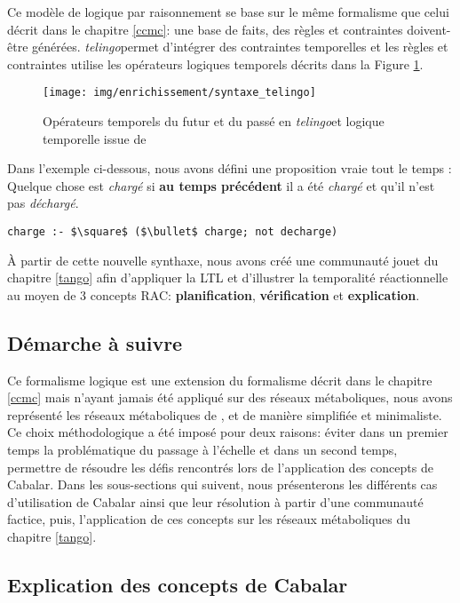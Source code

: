 \documentclass[../main.tex]{subfiles}
\begin{document}
Ce modèle de logique par raisonnement se base sur le même formalisme que celui décrit dans le chapitre \ref{ccmc}: une base de faits, des règles et contraintes doivent-être générées. \textit{telingo}permet d'intégrer des contraintes temporelles et les règles et contraintes utilise les opérateurs logiques temporels décrits dans la Figure \ref{fig:syntaxe}.

 \begin{figure}[h!]
	\centering
    \texttt{[image: img/enrichissement/syntaxe\_telingo]}
    \caption{Opérateurs temporels du futur et du passé en \textit{telingo}et logique temporelle issue de \citep{Cabalar2019}}
    \label{fig:syntaxe}
\end{figure}

Dans l'exemple ci-dessous, nous avons défini une proposition vraie tout le temps : Quelque chose est \textit{chargé} si \textbf{au temps précédent} il a été \textit{chargé} et qu'il n'est pas \textit{déchargé}.  

\begin{lstlisting}[mathescape=True]
    charge :- $\square$ ($\bullet$ charge; not decharge)
\end{lstlisting}

À partir de cette nouvelle synthaxe, nous avons créé une communauté jouet du chapitre \ref{tango} afin d'appliquer la LTL et d'illustrer la temporalité réactionnelle au moyen de 3 concepts RAC: \textbf{planification}, \textbf{vérification} et \textbf{explication}. 

\subsection{Démarche à suivre}
Ce formalisme logique est une extension du formalisme décrit dans le chapitre \ref{ccmc} mais n'ayant jamais été appliqué sur des réseaux métaboliques, nous avons représenté les réseaux métaboliques de \freud, \plantarum et \lactis de manière simplifiée et minimaliste. Ce choix méthodologique a été imposé pour deux raisons: éviter dans un premier temps la problématique du passage à l'échelle et dans un second temps, permettre de résoudre les défis rencontrés lors de l'application des concepts de Cabalar. Dans les sous-sections qui suivent, nous présenterons les différents cas d'utilisation de Cabalar ainsi que leur résolution à partir d'une communauté factice, puis, l'application de ces concepts sur les réseaux métaboliques du chapitre \ref{tango}.

\subsection{Explication des concepts de Cabalar}
\end{document}
